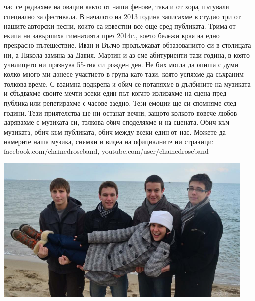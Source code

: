 \begin{multicols}{3}
час се радвахме на овации както от наши фенове, така и от хора, пътували специално за фестивала. В началото на 2013 година записахме в студио три от нашите авторски песни, които са известни все още сред публиката. Трима от екипа ни завършиха гимназията през 2014г., което бележи края на едно прекрасно пътешествие. Иван и Вълчо продължават образованието си в столицата ни, а Никола замина за Дания. Мартин и аз сме абитуриенти тази година, в която училището ни празнува 55-тия си рожден ден. 
Не бих могла да опиша с думи колко много ми донесе участието в група като тази, която успяхме да съхраним толкова време. С взаимна подкрепа и обич се потапяхме в дълбините на музиката и сбъдвахме своите мечти всеки един път когато излизахме на сцена пред публика или репетирахме с часове заедно. Тези емоции ще си спомняме след години. Тези приятелства ще ни останат вечни, защото колкото 
повече любов дарявахме с музиката си, толкова обич споделяхме и на сцената. Обич към музиката, обич към публиката, обич между всеки един от нас. 
Можете да намерите наша музика, снимки и видеа на официалните ни страници: 
facebook.com/chainedroseband, 
\small{youtube.com/user/chainedroseband}
\end{multicols}

\begin{center}
\includegraphics[width=5.0in]{./Chained_Rose/CR.jpg}
\end{center}
\closearticle
